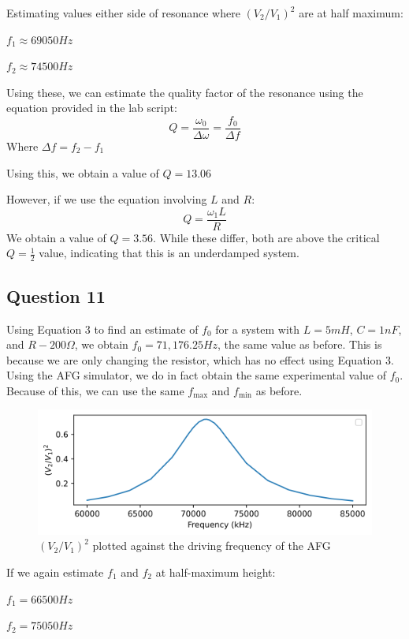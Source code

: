 \documentclass[a4paper]{article}
\begin{document}
Estimating values either side of resonance where $(V_2/V_1)^2$ are at half maximum:

$f_1\approx69050 Hz$

$f_2\approx74500 Hz$

Using these, we can estimate the quality factor of the resonance using the equation provided in the lab script:
\begin{equation}
Q=\frac{\omega_0}{\Delta\omega}=\frac{f_0}{\Delta f}
\end{equation}
Where $\Delta f=f_2-f_1$

Using this, we obtain a value of $Q=13.06$

However, if we use the equation involving $L$ and $R$:
\begin{equation}
Q=\frac{\omega_1L}R
\end{equation}
We obtain a value of $Q=3.56$. While these differ, both are above the critical $Q=\frac12$ value, indicating that this is an underdamped system. 

\subsection{Question 11}
Using Equation 3 to find an estimate of $f_0$ for a system with $L=5 mH$, $C=1 nF$, and $R-200 \Omega$, we obtain $f_0=71,176.25 Hz$, the same value as before. This is because we are only changing the resistor, which has no effect using Equation 3. Using the AFG simulator, we do in fact obtain the same experimental value of $f_0$. Because of this, we can use the same $f_\text{max}$ and $f_\text{min}$ as before.
\begin{figure}[h]
\includegraphics[scale=0.8]{qfac2.png}
\caption{$(V_2/V_1)^2$ plotted against the driving frequency of the AFG}
\end{figure}

If we again estimate $f_1$ and $f_2$ at half-maximum height:

$f_1=66500 Hz$

$f_2=75050 Hz$
\end{document}
